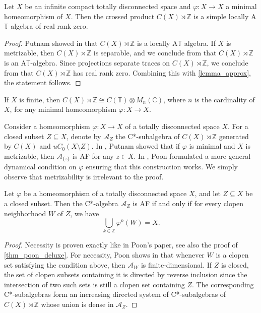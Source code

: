 \documentclass[12pt, a4paper, oneside]{amsart}
\newcommand{\0}{\mathbf{0}}
\newcommand{\1}{\mathbf{1}}
\newcommand{\Z}{\mathbb{Z}}   %
\newcommand{\C}{\mathbb{C}}   %
\newcommand{\A}{\mathscr{A}}
\newcommand{\T}{\mathbb{T}}
\begin{document}
	\begin{theorem}[Putnam]
		\label{thm_putnam}
		Let \(X\) be an infinite compact totally disconnected space and \(\varphi \colon X \to X\) a minimal homeomorphism of \(X\). Then the crossed product \(C(X) \rtimes  \Z\) is a simple locally A\(\T\) algebra of real rank zero. 
	\end{theorem}
	
	\begin{proof}
		Putnam showed in \cite[Theorem 2.1]{putnam} that \(C(X) \rtimes  \Z\) is a locally A\(\T\) algebra. If \(X\) is metrizable, then \(C(X) \rtimes  \Z\) is separable, and we conclude from \cite[§ 4.3]{elliott} that \(C(X) \rtimes  \Z\) is an A\(\T\)-algebra. Since projections separate traces on \(C(X) \rtimes  \Z\), we conclude from \cite[]{blackadar_etal} that \(C(X) \rtimes  \Z\) has real rank zero. Combining this with \cref{lemma_approx}, the statement follows. 
	\end{proof}
	
	\begin{remark}
		If \(X\) is finite, then \(C(X) \rtimes \Z \cong C(\T) \otimes M_n(\C)\), where \(n\) is the cardinality of \(X\), for any minimal homeomorphism \(\varphi \colon X \to X\). 
	\end{remark}
	
	Consider a homeomorphism \(\varphi \colon X \to X\) of a totally disconnected space \(X\). For a closed subset \(Z \subseteq X\), denote by \(\A_Z\) the C*-subalgebra of \(C(X) \rtimes  \Z\) generated by \(C(X)\) and \(u C_0(X \setminus Z)\). In \cite[Theorem 3.3]{putnam_AF}, Putnam showed that if \(\varphi\) is minimal and \(X\) is metrizable, then \(\A_{\{z\}}\) is AF for any \(z \in X\). In \cite[Theorem 2.3]{poon}, Poon formulated a more general dynamical condition on \(\varphi\) ensuring that this construction works. We simply observe that metrizability is irrelevant to the proof. 
	
	\begin{theorem}[Poon]
		\label{thm_poon}
		Let \(\varphi\) be a homeomorphism of a totally disconnected space \(X\), and let \(Z \subseteq X\) be a closed subset. Then the C*-algebra \(\A_Z\) is AF if and only if for every clopen neighborhood \(W\) of \(Z\), we have \[\bigcup_{k \in \Z} \varphi^k(W) = X.\]
	\end{theorem}
	
	\begin{proof}
		Necessity is proven exactly like in Poon's paper, see also the proof of \cref{thm_poon_deluxe}. For necessity, Poon shows in \cite[Lemma 2.2]{poon} that whenever \(W\) is a clopen set satisfying the condition above, then \(\A_W\) is finite-dimensional. If \(Z\) is closed, the set of clopen subsets containing it is directed by reverse inclusion since the intersection of two such sets is still a clopen set containing \(Z\). The corresponding C*-subalgebras form an increasing directed system of C*-subalgebras of \(C(X) \rtimes  \Z\) whose union is dense in \(\A_Z\). 
	\end{proof}
	
\end{document}
